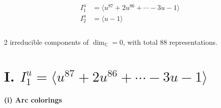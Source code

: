 \documentclass[1p]{elsarticle_modified}
\theoremstyle{definition}
\begin{document}
\begin{align*}
I^u_{1}&=\langle 
u^{87}+2 u^{86}+\cdots-3 u-1\rangle \\
I^u_{2}&=\langle 
u-1\rangle \\
\\
\end{align*}
\raggedright * 2 irreducible components of $\dim_{\mathbb{C}}=0$, with total 88 representations.\\
\newpage
\renewcommand{\arraystretch}{1}
\centering \section*{I. $I^u_{1}= \langle u^{87}+2 u^{86}+\cdots-3 u-1 \rangle$}
\flushleft \textbf{(i) Arc colorings}\\
\end{document}
